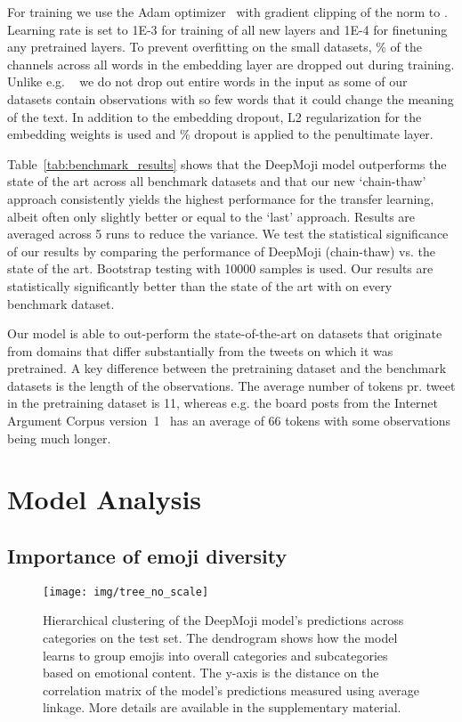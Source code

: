 \documentclass[11pt,a4paper]{article}
\begin{document}
For training we use the Adam optimizer~\cite{kingma2014adam} with gradient clipping of the norm to . Learning rate is set to \num{1E-3} for training of all new layers and \num{1E-4} for finetuning any pretrained layers. To prevent overfitting on the small datasets, \% of the channels across all words in the embedding layer are dropped out during training. Unlike e.g. ~\cite{gal2016theoretically} we do not drop out entire words in the input as some of our datasets contain observations with so few words that it could change the meaning of the text. In addition to the embedding dropout, L2 regularization for the embedding weights is used and \% dropout is applied to the penultimate layer.

Table~\ref{tab:benchmark_results} shows that the DeepMoji model outperforms the state of the art across all benchmark datasets and that our new `chain-thaw' approach consistently yields the highest performance for the transfer learning, albeit often only slightly better or equal to the `last' approach. Results are averaged across 5 runs to reduce the variance. We test the statistical significance of our results by comparing the performance of DeepMoji (chain-thaw) vs. the state of the art. Bootstrap testing with 10000 samples is used. Our results are statistically significantly better than the state of the art with  on every benchmark dataset.

Our model is able to out-perform the state-of-the-art on datasets that originate from domains that differ substantially from the tweets on which it was pretrained. A key difference between the pretraining dataset and the benchmark datasets is the length of the observations. The average number of tokens pr. tweet in the pretraining dataset is 11, whereas e.g. the board posts from the Internet Argument Corpus version~1~\cite{oraby2016creating} has an average of 66 tokens with some observations being much longer. 

\section{Model Analysis}
\label{sec:analysis}


\subsection{Importance of emoji diversity}
\label{sub_sec:emoji_diversity}



\begin{figure*}[tp]
  \centering
  \texttt{[image: img/tree\_no\_scale]} \caption{Hierarchical clustering of the DeepMoji model's predictions across categories on the test set. The dendrogram shows how the model learns to group emojis into overall categories and subcategories based on emotional content. The y-axis is the distance on the correlation matrix of the model's predictions measured using average linkage. More details are available in the supplementary material.}
  \label{fig:tree}
\end{figure*}
\end{document}

